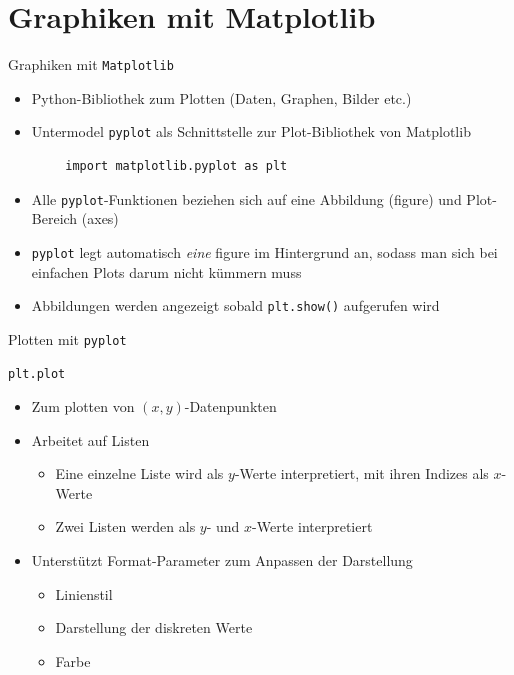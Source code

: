 \documentclass[utf8, smaller, c]{beamer}
\renewcommand{\tt}[1]{{\texttt{#1}}}
\begin{document}
\section{Graphiken mit Matplotlib}
\begin{frame}[fragile]{Graphiken mit \tt{Matplotlib}}
	\begin{itemize}
		\item Python-Bibliothek zum Plotten (Daten, Graphen, Bilder etc.)
		\item Untermodel \tt{pyplot} als Schnittstelle zur Plot-Bibliothek von Matplotlib
	\end{itemize}	
	\begin{lstlisting}
		import matplotlib.pyplot as plt
	\end{lstlisting}
	\begin{itemize}
		\item Alle \tt{pyplot}-Funktionen beziehen sich auf eine Abbildung (figure) und Plot-Bereich (axes)
		\item \tt{pyplot} legt automatisch \textit{eine} figure im Hintergrund an, sodass man sich bei einfachen Plots darum nicht kümmern muss
		\item Abbildungen werden angezeigt sobald \tt{plt.show()} aufgerufen wird
	\end{itemize}
\end{frame}

\begin{frame}[fragile]{Plotten mit \tt{pyplot}}
	\begin{block}{\tt{plt.plot}}
	\begin{itemize}
		\item Zum plotten von $(x,y)$-Datenpunkten
		\item Arbeitet auf Listen
		\begin{itemize}
			\item Eine einzelne Liste wird als $y$-Werte interpretiert, mit ihren Indizes als $x$-Werte
			\item Zwei Listen werden als $y$- und $x$-Werte interpretiert
		\end{itemize}
		\item Unterstützt Format-Parameter zum Anpassen der Darstellung
		\begin{itemize}
			\item Linienstil
			\item Darstellung der diskreten Werte
			\item Farbe
		\end{itemize}
	\end{itemize}
	\end{block}
\end{frame}
\end{document}
